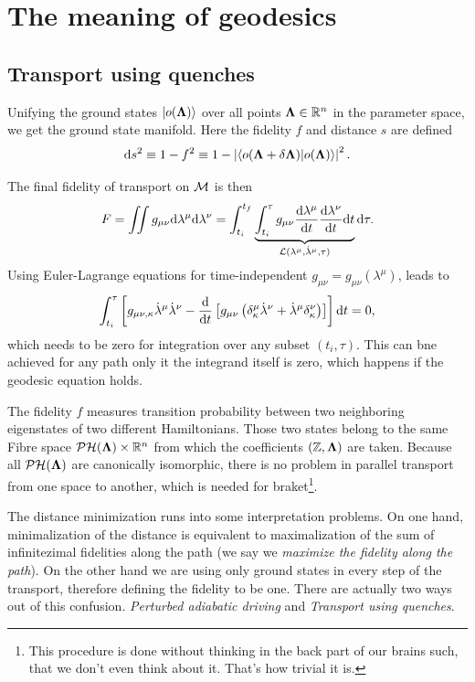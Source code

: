 \chapter{The meaning of geodesics}


\section{Transport using quenches}
\label{sec:quenches}
Unifying the ground states $\ket{o({\bm\Lambda})}$ over all points ${\bm\Lambda}\in\mathbb{R}^n$ in the parameter space, we get the ground state manifold. Here the fidelity $f$ and distance $s$ are defined
\begin{equation}
    \mathrm{d} s^2 \equiv 1-f^2\equiv 1-\left|\braket{o(\bm{{\bm\Lambda}}+\delta\bm{{\bm\Lambda}})|o(\bm{{\bm\Lambda}})}\right|^2.
    \label{eq:distanceOnM0}
\end{equation}

The final fidelity of transport on $\mathcal{M}$ is then
\begin{equation}
    F=\iint g_{\mu\nu}\mathrm{d}\lambda^\mu\mathrm{d}\lambda^\nu = \int_{t_i}^{t_f}\underbrace{\int_{t_i}^\tau g_{\mu\nu}\frac{\mathrm{d} \lambda^\mu}{\mathrm{d} t}\frac{\mathrm{d} \lambda^\nu}{\mathrm{d} t} \mathrm{d} t}_{\mathcal{L}(\lambda^\mu,\dot\lambda^\mu,\tau)}\mathrm{d} \tau .
\end{equation}
Using Euler-Lagrange equations for time-independent $g_{\mu\nu}=g_{\mu\nu}(\lambda^\mu)$, leads to
\begin{equation}
    \int_{t_i}^{\tau}\left[g_{\mu\nu,\kappa}\dot\lambda^\mu\dot\lambda^\nu - \frac{\mathrm{d} }{\mathrm{d} t}\left[g_{\mu\nu}\left(\delta^\mu_\kappa\dot\lambda^\nu+\dot\lambda^\mu\delta^\nu_\kappa\right)\right]\right]\mathrm{d} t=0,
\end{equation}
which needs to be zero for integration over any subset $(t_i,\tau)$. This can bne achieved for any path only it the integrand itself is zero, which happens if the geodesic equation holds.

The fidelity $f$ measures transition probability between two neighboring eigenstates of two different Hamiltonians. Those two states belong to the same Fibre space $\mathcal{PH}({\bm\Lambda})\times \mathbb{R}^n$ from which the coefficients $(\mathbb{Z},{\bm\Lambda})$ are taken. Because all $\mathcal{PH}({\bm\Lambda})$ are canonically isomorphic, there is no problem in parallel transport from one space to another, which is needed for braket\footnote{This procedure is done without thinking in the back part of our brains such, that we don't even think about it. That's how trivial it is.}.

The distance minimization runs into some interpretation problems. On one hand, minimalization of the distance is equivalent to maximalization of the sum of infinitezimal fidelities along the path (we say we \emph{maximize the fidelity along the path}). On the other hand we are using only ground states in every step of the transport, therefore defining the fidelity to be one. There are actually two ways out of this confusion. \emph{Perturbed adiabatic driving} and \emph{Transport using quenches}.


